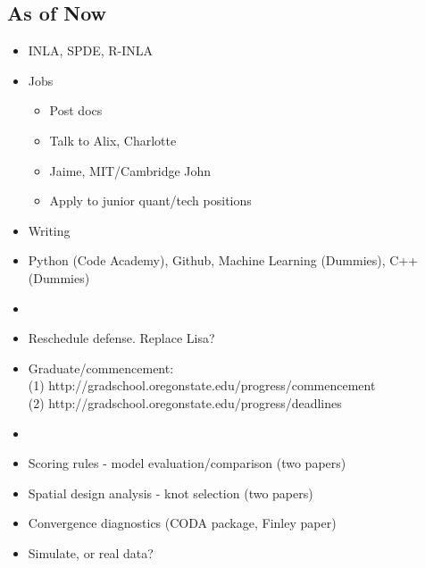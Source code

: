 \documentclass{article}
\begin{document}
\subsection*{As of Now}
\begin{itemize}
\item INLA, SPDE, R-INLA
\item Jobs
  \begin{itemize}
  \item Post docs
  \item Talk to Alix, Charlotte
  \item Jaime, MIT/Cambridge John
  \item Apply to junior quant/tech positions
  \end{itemize}
\item Writing
\item Python (Code Academy), Github, Machine Learning (Dummies), C++ (Dummies)
\item
\item Reschedule defense. Replace Lisa?
\item Graduate/commencement: \\
(1) http://gradschool.oregonstate.edu/progress/commencement \\ 
(2) http://gradschool.oregonstate.edu/progress/deadlines \\
\item 
\item Scoring rules - model evaluation/comparison (two papers)
\item Spatial design analysis - knot selection (two papers)
\item Convergence diagnostics (CODA package, Finley paper)
\item Simulate, or real data?
\end{itemize}

% 

\end{document}
